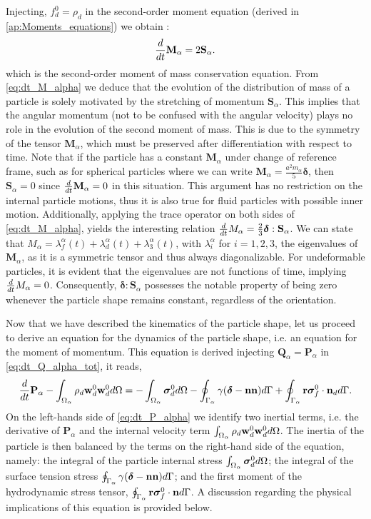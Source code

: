 Injecting, $f_d^0 = \rho_d$ in the second-order moment equation (derived in \ref{ap:Moments_equations}) we obtain :
\begin{equation}
    \frac{d}{dt} {\textbf{M}_\alpha}=2\textbf{S}_\alpha. 
    \label{eq:dt_M_alpha}
\end{equation}
which is the second-order moment of mass conservation equation. 
From \ref{eq:dt_M_alpha} we deduce that the evolution of the distribution of mass of a particle is solely motivated by the stretching of momentum $\textbf{S}_\alpha$. 
This implies that the angular momentum (not to be confused with the angular velocity) plays no role in the evolution of the second moment of mass. 
This is due to the symmetry of the tensor $\textbf{M}_\alpha$, which must be preserved after differentiation with respect to time.
Note that if the particle has a constant $\textbf{M}_\alpha$ under change of reference frame, such as for spherical particles where we can write $\textbf{M}_\alpha= \frac{a^2 m_\alpha}{5} \bm\delta$, then $\textbf{S}_\alpha=0$ since $\frac{d}{dt} \textbf{M}_\alpha = 0$ in this situation.
This argument has no restriction on the internal particle motions, thus it is also true for fluid particles with possible inner motion. 
Additionally, applying the trace operator on both sides of \ref{eq:dt_M_alpha}, yields the interesting relation $\frac{d}{dt} {M_\alpha}=\frac{2}{3}\bm\delta : \textbf{S}_\alpha$.
We can state that $M_\alpha = \lambda^\alpha_f(t)+\lambda^\alpha_d(t)+\lambda^\alpha_3(t)$, with $\lambda_i^\alpha$ for $i=1,2,3$, the eigenvalues of $\textbf{M}_\alpha$, as it is a symmetric tensor and thus always diagonalizable.
For undeformable particles, it is evident that the eigenvalues are not functions of time, implying $\frac{d}{dt} M_\alpha = 0$.  
Consequently, $\bm\delta : \textbf{S}_\alpha$ possesses the notable property of being zero whenever the particle shape remains constant, regardless of the orientation.

Now that we have described the kinematics of the particle shape, let us proceed to derive an equation for the dynamics of the particle shape, i.e. an equation for the moment of momentum. 
This equation is derived injecting $\textbf{Q}_\alpha = \textbf{P}_\alpha$ in \ref{eq:dt_Q_alpha_tot}, it reads, 
\begin{equation}
    \frac{d}{dt} {\textbf{P}_\alpha}
    - \int_{\Omega_\alpha}  \rho_d  \textbf{w}_d^0 \textbf{w}_d^0  d\Omega
    = 
    - \int_{\Omega_\alpha} \bm{\sigma}_d^0 d\Omega
    - \oint_{\Gamma_\alpha}  
        \gamma (\bm\delta - \textbf{nn})
     d\Gamma
    + \oint_{\Gamma_\alpha}  \textbf{r}\bm{\sigma}_f^0\cdot \textbf{n}_d d\Gamma.
    \label{eq:dt_P_alpha}
\end{equation}
On the left-hands side of \ref{eq:dt_P_alpha} we identify two inertial terms, i.e. the derivative of $\textbf{P}_\alpha$ and the internal velocity term $\int_{\Omega_\alpha} \rho_d\textbf{w}_d^0\textbf{w}_d^0  d\Omega$.
The inertia of the particle is then balanced by the terms on the right-hand side of the equation, namely: 
the integral of the particle internal stress $\int_{\Omega_\alpha}  \bm{\sigma}_d^0 d\Omega$; 
the integral of the surface tension stress $\oint_{\Gamma_\alpha}  \gamma (\bm\delta- \textbf{nn})  d\Gamma$; 
and the first moment of the hydrodynamic stress tensor, $\oint_{\Gamma_\alpha} \textbf{r}\bm\sigma_f^0\cdot \textbf{n} d\Gamma$.
A discussion regarding the physical implications of this equation is provided below. 

